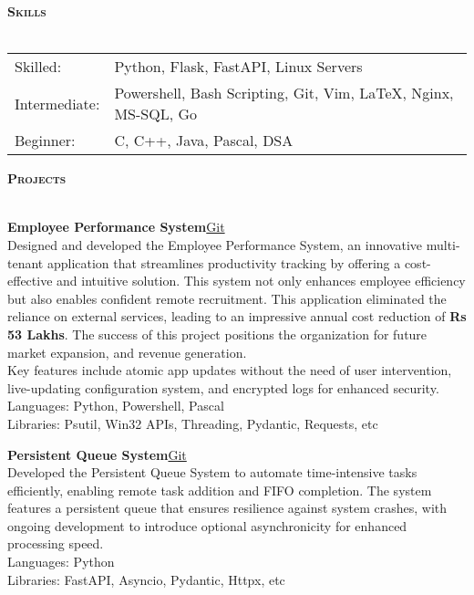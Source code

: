 \documentclass[a4paper]{article}
\newcommand{\lineunder} {
\vspace*{-8pt} \\
\hspace*{-18pt} \hrulefill \\
}
\newcommand{\header}[1]{%
{\hspace*{-18pt}\vspace*{6pt} \textsc{\textbf{\Large{#1}}}}%
\vspace*{-6pt} \lineunder
}
\begin{document}

\header{Skills}
\vspace{1mm}

\begin{tabular}{V{5cm} @{\hskip 0.6cm} V{12cm}}
Skilled: & Python, Flask, FastAPI, Linux Servers \\
Intermediate: & Powershell, Bash Scripting, Git, Vim, \LaTeX, Nginx, MS-SQL, Go \\
Beginner: & C, C++, Java, Pascal, DSA \\
\end{tabular}

\vspace{4mm}


\header{Projects}
\vspace{1mm}

{\textbf{Employee Performance System}}\hfill \href{https://github.com/swarnimcodes/employee-performance}{Git}\\
Designed and developed the Employee Performance System, an innovative multi-tenant application that 
streamlines productivity tracking by offering a cost-effective and intuitive solution. 
This system not only enhances employee efficiency but also enables confident 
remote recruitment. This application eliminated the reliance on external services, 
leading to an impressive annual cost reduction of \textbf{Rs 53 Lakhs}. 
The success of this project positions the organization for future market expansion,
and revenue generation. \\
Key features include atomic app updates without the need of user intervention,
live-updating configuration system, and encrypted logs for enhanced security. \\
Languages: Python, Powershell, Pascal \\
Libraries: Psutil, Win32 APIs, Threading, Pydantic, Requests, etc \\
\vspace*{2mm}

{\textbf{Persistent Queue System}}\hfill \href{https://github.com/swarnimcodes/kafkaesqueue}{Git}\\
Developed the Persistent Queue System to automate time-intensive tasks efficiently, 
enabling remote task addition and FIFO completion. The system features a persistent 
queue that ensures resilience against system crashes, with ongoing development to 
introduce optional asynchronicity for enhanced processing speed. \\
Languages: Python \\
Libraries: FastAPI, Asyncio, Pydantic, Httpx, etc \\
\vspace*{2mm}
\end{document}
